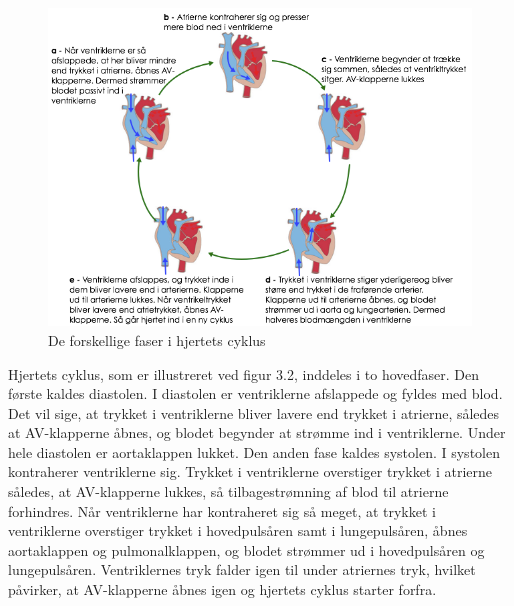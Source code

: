 \begin{figure}[htb]
	\centering
	\includegraphics[width=1\textwidth]{Figurer/Fysio/Cyklus}
	\caption{De forskellige faser i hjertets cyklus \protect\footnotemark}
\end{figure}

Hjertets cyklus, som er illustreret ved figur 3.2, inddeles i to hovedfaser. Den første kaldes diastolen. I diastolen er ventriklerne afslappede og fyldes med blod. Det vil sige, at trykket i ventriklerne bliver lavere end trykket i atrierne, således at AV-klapperne åbnes, og blodet begynder at strømme ind i ventriklerne. Under hele diastolen er aortaklappen lukket. Den anden fase kaldes systolen. I systolen kontraherer ventriklerne sig. Trykket i ventriklerne overstiger trykket i atrierne således, at AV-klapperne lukkes, så tilbagestrømning af blod til atrierne forhindres. Når ventriklerne har kontraheret sig så meget, at trykket i ventriklerne overstiger trykket i hovedpulsåren samt i lungepulsåren, åbnes aortaklappen og pulmonalklappen, og blodet strømmer ud i hovedpulsåren og lungepulsåren. Ventriklernes tryk falder igen til under atriernes tryk, hvilket påvirker, at AV-klapperne åbnes igen og hjertets cyklus starter forfra.\\

